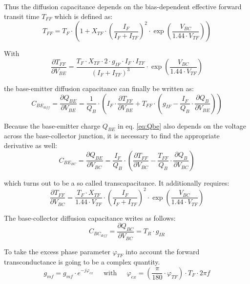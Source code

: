 Thus the diffusion capacitance depends on the bias-dependent effective
forward transit time $T_{FF}$ which is defined as:
\begin{equation}
T_{FF} = T_F \cdot\left(1 + X_{TF} \cdot \left(\dfrac{I_F}{I_F + I_{TF}}\right)^2 \cdot \exp{\left(\dfrac{V_{BC}}{1.44\cdot V_{TF}}\right)}\right)
\end{equation}

With
\begin{equation}
\frac{\partial T_{FF}}{\partial V_{BE}} = \dfrac{T_F\cdot X_{TF}\cdot 2\cdot g_{IF}\cdot I_F\cdot I_{TF}}{\left(I_F + I_{TF}\right)^3}\cdot \exp{\left(\dfrac{V_{BC}}{1.44\cdot V_{TF}}\right)}
\end{equation}

the base-emitter diffusion capacitance can finally be written as:
\begin{equation}
C_{BE_{diff}} = \dfrac{\partial Q_{BE}}{\partial V_{BE}} = \dfrac{1}{Q_B}\cdot \left(I_F\cdot \dfrac{\partial T_{FF}}{\partial V_{BE}} + T_{FF}\cdot\left(g_{IF} - \dfrac{I_F}{Q_B}\cdot \dfrac{\partial Q_B}{\partial V_{BE}}\right)\right)
\end{equation}

Because the base-emitter charge $Q_{BE}$ in eq. \eqref{eq:Qbe} also
depends on the voltage across the base-collector junction, it is
necessary to find the appropriate derivative as well:
\begin{equation}
C_{BE_{BC}} = \dfrac{\partial Q_{BE}}{\partial V_{BC}} = \dfrac{I_F}{Q_B}\cdot\left(\dfrac{\partial T_{FF}}{\partial V_{BC}} - \dfrac{T_{FF}}{Q_B} \cdot \dfrac{\partial Q_{B}}{\partial V_{BC}}\right)
\end{equation}

which turns out to be a so called transcapacitance.  It additionally
requires:
\begin{equation}
\dfrac{\partial T_{FF}}{\partial V_{BC}} = \dfrac{T_F\cdot X_{TF}}{1.44\cdot V_{TF}} \cdot \left(\dfrac{I_F}{I_F + I_{TF}}\right)^2 \cdot \exp{\left(\dfrac{V_{BC}}{1.44\cdot V_{TF}}\right)}
\end{equation}

The base-collector diffusion capacitance writes as follows:
\begin{equation}
C_{BC_{diff}} = \dfrac{\partial Q_{BC}}{\partial V_{BC}} = T_{R} \cdot g_{IR}
\end{equation}

To take the excess phase parameter $\varphi_{TF}$ into account the
forward transconductance is going to be a complex quantity.
\begin{equation}
g_{mf} = g_{mf}\cdot e^{-j\varphi_{ex}}
\;\;\;\; \textrm{ with } \;\;\;\;
\varphi_{ex} = \left(\dfrac{\pi}{180}\cdot\varphi_{TF}\right)\cdot T_F\cdot 2\pi f
\end{equation}

